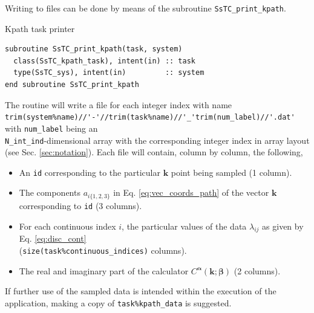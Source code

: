 \documentclass[10pt,a4paper]{article}
\begin{document}
Writing to files can be done by means of the subroutine \verb|SsTC_print_kpath|.
\begin{codebox}{Kpath task printer}
\begin{lstlisting}[caption={Interface of the kpath task printer.},captionpos=b]
subroutine SsTC_print_kpath(task, system)
  class(SsTC_kpath_task), intent(in) :: task
  type(SsTC_sys), intent(in)         :: system
end subroutine SsTC_print_kpath
\end{lstlisting}
\end{codebox}
The routine will write a file for each integer index with name \\ \verb|trim(system%name)//'-'//trim(task%name)//'_'trim(num_label)//'.dat'| with \verb|num_label| being an \\ \verb|N_int_ind|-dimensional array with the corresponding integer index in array layout (see Sec. \ref{sec:notation}). Each file will contain, column by column, the following,
\begin{tcolorbox}
\begin{itemize}
\item An \verb|id| corresponding to the particular $\bm{k}$ point being sampled (1 column).
\item The components $a_{i\{1, 2, 3\}}$ in Eq. \eqref{eq:vec_coords_path} of the vector $\bm{k}$ corresponding to \verb|id| (3 columns).
\item For each continuous index $i$, the particular values of the data $\lambda_{ij}$ as given by Eq. \eqref{eq:disc_cont} \\ (\verb|size(task%continuous_indices)| columns).
\item The real and imaginary part of the calculator $C^{\bm{\alpha}}(\bm{k}; \bm{\beta})$ (2 columns).
\end{itemize}
\end{tcolorbox}
If further use of the sampled data is intended within the execution of the application, making a copy of \verb|task%kpath_data| is suggested.
\end{document}
